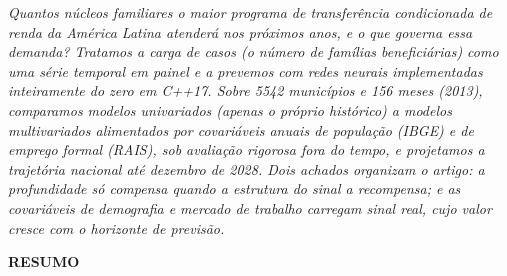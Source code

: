 \documentclass[12pt,a4paper,oneside]{article}
\begin{document}
\begin{titlepage}
\begin{center}
    \vfill

    \begin{minipage}{0.86\textwidth}\centering\small
      \textit{Quantos núcleos familiares o maior programa de transferência
      condicionada de renda da América Latina atenderá nos próximos anos, e o
      que governa essa demanda? Tratamos a \emph{carga de casos} (o número de
      famílias beneficiárias) como uma série temporal em painel e a prevemos
      com redes neurais implementadas inteiramente do zero em C++17. Sobre
      \num{5542} municípios e 156 meses (2013), comparamos
      modelos \emph{univariados} (apenas o próprio histórico) a modelos
      \emph{multivariados} alimentados por covariáveis anuais de população
      (IBGE) e de emprego formal (RAIS), sob avaliação rigorosa fora do tempo,
      e projetamos a trajetória nacional até dezembro de 2028. Dois achados
      organizam o artigo: a profundidade só compensa quando a estrutura do
      sinal a recompensa; e as covariáveis de demografia e mercado de trabalho
      carregam sinal real, cujo valor cresce com o horizonte de previsão.}
    \end{minipage}

    \vspace{0.8cm}
  \end{center}
\end{titlepage}

\begin{center}
{\bfseries RESUMO}
\end{center}
\end{document}
